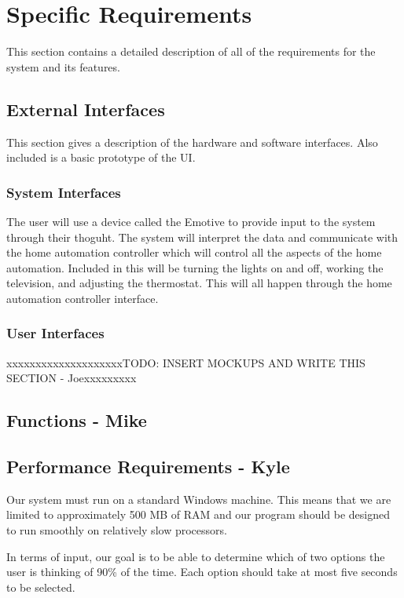 \documentclass{article}
\begin{document}
\section{Specific Requirements}
This section contains a detailed description of all of the requirements for the system and its features. 

\subsection{External Interfaces}
This section gives a description of the hardware and software interfaces. Also included is a basic prototype of the UI.

\subsubsection{System Interfaces}

The user will use a device called the Emotive to provide input to the system through their thoguht. The system will interpret the data and communicate with the home automation controller which will control all the aspects of the home automation. Included in this will be turning the lights on and off, working the television, and adjusting the thermostat. This will all happen through the home automation controller interface.

\subsubsection{User Interfaces}
{\color{red}xxxxxxxxxxxxxxxxxxxxTODO: INSERT MOCKUPS AND WRITE THIS SECTION - Joexxxxxxxxx}

\subsection{Functions - Mike}

\subsection{Performance Requirements - Kyle}
Our system must run on a standard Windows machine. This means that we are limited to approximately 500 MB of RAM and our program should be designed to run smoothly on relatively slow processors.

In terms of input, our goal is to be able to determine which of two options the user is thinking of 90\% of the time. Each option should take at most five seconds to be selected.
\end{document}
